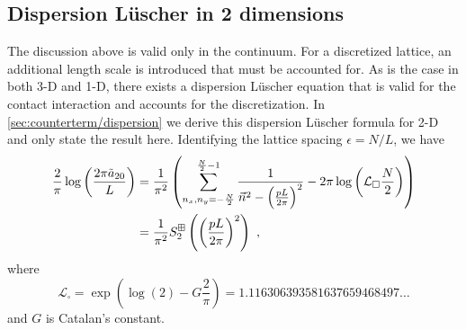 \subsection{Dispersion L\"uscher in 2 dimensions}
The discussion above is valid only in the continuum.  For a discretized lattice, an additional length scale is introduced that must be accounted for.  As is the case in both 3-D and 1-D, there exists a dispersion L\"uscher equation that is valid for the contact interaction and accounts for the discretization.  In \autoref{sec:counterterm/dispersion} we derive this dispersion L\"uscher formula for 2-D and only state the result here.  Identifying the lattice spacing $\epsilon=N/L$, we have
\begin{align}
\frac{2}{\pi} \log \left(\frac{2\pi \tilde a_{20}}{L}\right)&=\frac{1}{\pi^2}\left( \sum_{n_x,n_y=-\frac{N}{2}}^{\frac{N}{2}-1}\frac{1}{\vec{n}^2-\left(\frac{pL}{2\pi}\right)^2}-2\pi \log \left(\mathcal{L}_\square\frac{N}{2}\right)\right)\nonumber\\
&=\frac{1}{\pi^2}S^{\dispersion}_2\left(\left(\frac{pL}{2\pi}\right)^2\right)\ ,\label{eq:2d dispersion luscher}
\end{align}
where
\begin{equation}
\mathcal{L}_{\square}=\exp \left(\log (2)-G \frac{2}{\pi}\right)=1.116306393581637659468497 \ldots
\end{equation}
and $G$ is Catalan's constant.

